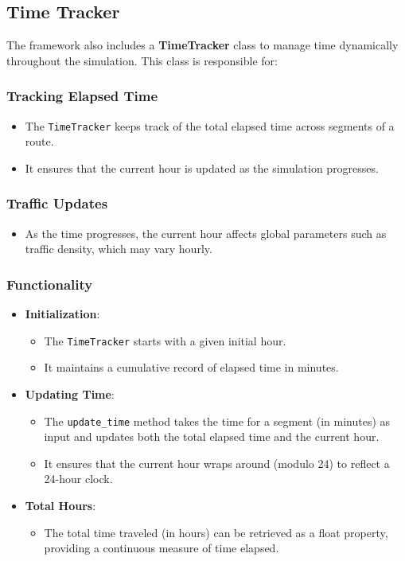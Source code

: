 \documentclass[sigplan,screen]{acmart}
\begin{document}
\subsection{Time Tracker}
The framework also includes a \textbf{TimeTracker} class to manage time dynamically throughout the simulation. This class is responsible for:

\subsubsection{Tracking Elapsed Time}
\begin{itemize}
    \item The \texttt{TimeTracker} keeps track of the total elapsed time across segments of a route.
    \item It ensures that the current hour is updated as the simulation progresses.
\end{itemize}

\subsubsection{Traffic Updates}
\begin{itemize}
    \item As the time progresses, the current hour affects global parameters such as traffic density, which may vary hourly.
\end{itemize}

\subsubsection{Functionality}
\begin{itemize}
    \item \textbf{Initialization}:
    \begin{itemize}
        \item The \texttt{TimeTracker} starts with a given initial hour.
        \item It maintains a cumulative record of elapsed time in minutes.
    \end{itemize}

    \item \textbf{Updating Time}:
    \begin{itemize}
        \item The \texttt{update\_time} method takes the time for a segment (in minutes) as input and updates both the total elapsed time and the current hour.
        \item It ensures that the current hour wraps around (modulo 24) to reflect a 24-hour clock.
    \end{itemize}

    \item \textbf{Total Hours}:
    \begin{itemize}
        \item The total time traveled (in hours) can be retrieved as a float property, providing a continuous measure of time elapsed.
    \end{itemize}
\end{itemize}
\end{document}
